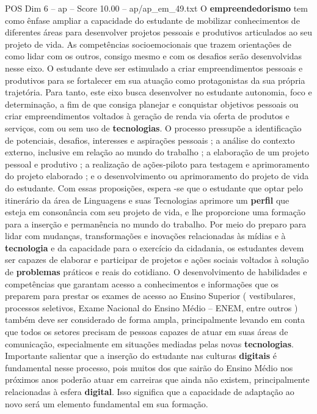 \begin{textsample}{POS Dim 6 – ap – Score 10.00 – ap/ap\_em\_49.txt}
O \textbf{empreendedorismo} tem como ênfase ampliar a capacidade do estudante de mobilizar conhecimentos de diferentes áreas para desenvolver projetos pessoais e produtivos articulados ao seu projeto de vida.
As competências socioemocionais que trazem orientações de como lidar com os outros, consigo mesmo e com os desafios serão desenvolvidas nesse eixo.
O estudante deve ser estimulado a criar empreendimentos pessoais e produtivos para se fortalecer em sua atuação como protagonistas da sua própria trajetória.
Para tanto, este eixo busca desenvolver no estudante autonomia, foco e determinação, a fim de que consiga planejar e conquistar objetivos pessoais ou criar empreendimentos voltados à geração de renda via oferta de produtos e serviços, com ou sem uso de \textbf{tecnologias}.
O processo pressupõe a identificação de potenciais, desafios, interesses e aspirações pessoais ; a análise do contexto externo, inclusive em relação ao mundo do trabalho ; a elaboração de um projeto pessoal e produtivo ; a realização de ações-piloto para testagem e aprimoramento do projeto elaborado ; e o desenvolvimento ou aprimoramento do projeto de vida do estudante.
Com essas proposições, espera -se que o estudante que optar pelo itinerário da área de Linguagens e suas Tecnologias aprimore um \textbf{perfil} que esteja em consonância com seu projeto de vida, e lhe proporcione uma formação para a inserção e permanência no mundo do trabalho.
Por meio do preparo para lidar com mudanças, transformações e inovações relacionadas às mídias e à \textbf{tecnologia} e da capacidade para o exercício da cidadania, os estudantes devem ser capazes de elaborar e participar de projetos e ações sociais voltados à solução de \textbf{problemas} práticos e reais do cotidiano.
O desenvolvimento de habilidades e competências que garantam acesso a conhecimentos e informações que os preparem para prestar os exames de acesso ao Ensino Superior ( vestibulares, processos seletivos, Exame Nacional do Ensino Médio – ENEM, entre outros ) também deve ser considerado de forma ampla, principalmente levando em conta que todos os setores precisam de pessoas capazes de atuar em suas áreas de comunicação, especialmente em situações mediadas pelas novas \textbf{tecnologias}.
Importante salientar que a inserção do estudante nas culturas \textbf{digitais} é fundamental nesse processo, pois muitos dos que sairão do Ensino Médio nos próximos anos poderão atuar em carreiras que ainda não existem, principalmente relacionadas à esfera \textbf{digital}.
Isso significa que a capacidade de adaptação ao novo será um elemento fundamental em sua formação.

\end{textsample}
